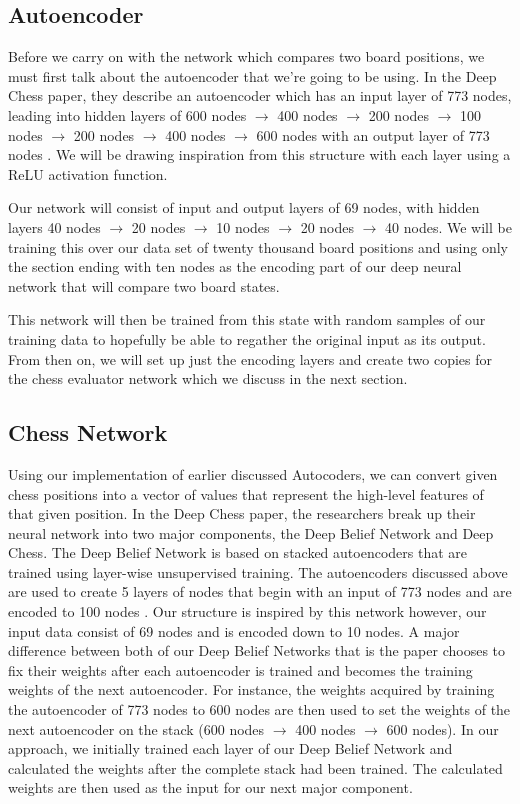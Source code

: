\documentclass[12pt]{article}
\begin{document}
    \subsection{Autoencoder}

    Before we carry on with the network which compares two board positions, we must first talk about the autoencoder that we're going to be using. In the Deep Chess paper, they describe an autoencoder which has an input layer of 773 nodes, leading into hidden layers of 600 nodes $\rightarrow$ 400 nodes $\rightarrow$ 200 nodes $\rightarrow$ 100 nodes $\rightarrow$ 200 nodes $\rightarrow$ 400 nodes $\rightarrow$ 600 nodes with an output layer of 773 nodes \cite{deepchess}. We will be drawing inspiration from this structure with each layer using a ReLU activation function. 

    Our network will consist of input and output layers of 69 nodes, with hidden layers 40 nodes $\rightarrow$ 20 nodes $\rightarrow$ 10 nodes $\rightarrow$ 20 nodes $\rightarrow$ 40 nodes. We will be training this over our data set of twenty thousand board positions and using only the section ending with ten nodes as the encoding part of our deep neural network that will compare two board states. 

    This network will then be trained from this state with random samples of our training data to hopefully be able to regather the original input as its output. From then on, we will set up just the encoding layers and create two copies for the chess evaluator network which we discuss in the next section.

    \subsection{Chess Network}

    Using our implementation of earlier discussed Autocoders, we can convert given chess positions into a vector of values that represent the high-level features of that given position. In the Deep Chess paper, the researchers break up their neural network into two major components, the Deep Belief Network and Deep Chess. The Deep Belief Network is based on stacked autoencoders that are trained using layer-wise unsupervised training. The autoencoders discussed above are used to create 5 layers of nodes that begin with an input of 773 nodes and are encoded to 100 nodes \cite{deepchess}. Our structure is inspired by this network however, our input data consist of 69 nodes and is encoded down to 10 nodes. A major difference between both of our Deep Belief Networks that is the paper chooses to fix their weights after each autoencoder is trained and becomes the training weights of the next autoencoder. For instance, the weights acquired by training the autoencoder of 773 nodes to 600 nodes are then used to set the weights of the next autoencoder on the stack (600 nodes $\rightarrow$ 400 nodes $\rightarrow$ 600 nodes). In our approach, we initially trained each layer of our Deep Belief Network and calculated the weights after the complete stack had been trained. The calculated weights are then used as the input for our next major component.
\end{document}
